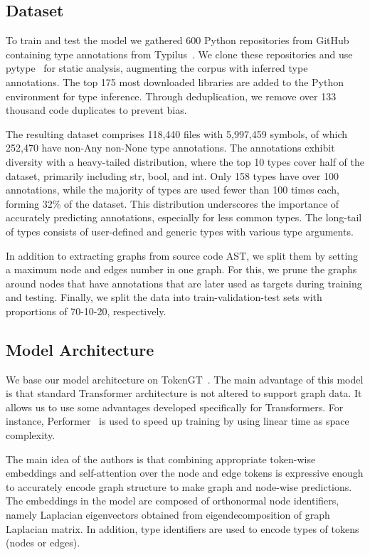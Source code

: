 \subsection{Dataset}\label{subsec:dataset}

To train and test the model we gathered 600 Python repositories from GitHub containing type annotations from Typilus~\cite{allamanis2020typilus}.
We clone these repositories and use pytype~\cite{PyType} for static analysis, augmenting the corpus with inferred type annotations.
The top 175 most downloaded libraries are added to the Python environment for type inference.
Through deduplication, we remove over 133 thousand code duplicates to prevent bias.

The resulting dataset comprises 118,440 files with 5,997,459 symbols, of which 252,470 have non-Any non-None type annotations.
The annotations exhibit diversity with a heavy-tailed distribution, where the top 10 types cover half of the dataset, primarily including str, bool, and int.
Only 158 types have over 100 annotations, while the majority of types are used fewer than 100 times each, forming 32\% of the dataset.
This distribution underscores the importance of accurately predicting annotations, especially for less common types.
The long-tail of types consists of user-defined and generic types with various type arguments.

In addition to extracting graphs from source code AST, we split them by setting a maximum node and edges number in one graph.
For this, we prune the graphs around nodes that have annotations that are later used as targets during training and testing.
Finally, we split the data into train-validation-test sets with proportions of 70-10-20, respectively.

\subsection{Model Architecture}\label{subsec:model-architecture}

We base our model architecture on TokenGT~\cite{kim_pure_2022}.
The main advantage of this model is that standard Transformer architecture is not altered to support graph data.
It allows us to use some advantages developed specifically for Transformers.
For instance, Performer~\cite{choromanski_rethinking_2020} is used to speed up training by using linear time as space complexity.

The main idea of the authors is that combining appropriate token-wise embeddings and self-attention over the node and edge tokens
is expressive enough to accurately encode graph structure to make graph and node-wise predictions.
The embeddings in the model are composed of orthonormal node identifiers, namely Laplacian eigenvectors obtained from
eigendecomposition of graph Laplacian matrix.
In addition, type identifiers are used to encode types of tokens (nodes or edges).

